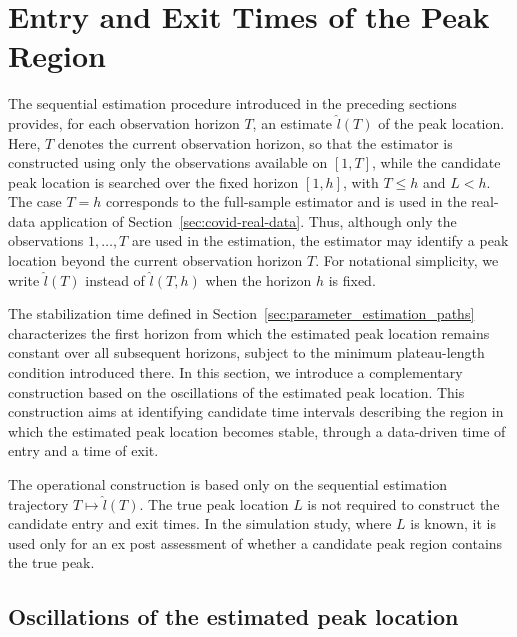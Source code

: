 \documentclass[12pt,a4paper]{article}
\begin{document}
\section{Entry and Exit Times of the Peak Region}
\label{sec:entry-exit}

The sequential estimation procedure introduced in the preceding sections provides, for each observation horizon \(T\), an estimate \(\hat{l}(T)\) of the peak location. Here, \(T\) denotes the current observation horizon, so that the estimator is constructed using only the observations available on \([1,T]\), while the candidate peak location is searched over the fixed horizon \([1,h]\), with \(T \le h\) and \(L<h\). The case \(T=h\) corresponds to the full-sample estimator and is used in the real-data application of Section~\ref{sec:covid-real-data}.
Thus, although only the observations \(1,\ldots,T\) are used in the estimation, the estimator may identify a peak location beyond the current observation horizon \(T\). For notational simplicity, we write \(\hat{l}(T)\) instead of \(\hat{l}(T,h)\) when the horizon \(h\) is fixed.

The stabilization time defined in Section~\ref{sec:parameter_estimation_paths} characterizes the first horizon from which the estimated peak location remains constant over all subsequent horizons, subject to the minimum plateau-length condition introduced there. In this section, we introduce a complementary construction based on the oscillations of the estimated peak location. This construction aims at identifying candidate time intervals describing the region in which the estimated peak location becomes stable, through a data-driven time of entry and a time of exit.

The operational construction is based only on the sequential estimation trajectory
\(
T\longmapsto\hat{l}(T).
\)
The true peak location \(L\) is not required to construct the candidate entry and exit times. In the simulation study, where \(L\) is known, it is used only for an ex post assessment of whether a candidate peak region contains the true peak.

\subsection{Oscillations of the estimated peak location}
\label{subsec:oscillations}
\end{document}
